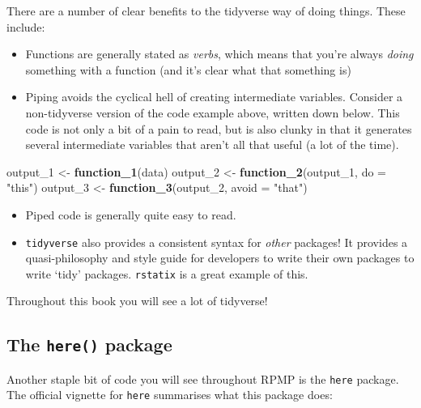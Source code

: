 \documentclass[
]{book}
\newenvironment{Shaded}{\begin{snugshade}}{\end{snugshade}}
\newcommand{\AttributeTok}[1]{\textcolor[rgb]{0.13,0.29,0.53}{#1}}
\newcommand{\FunctionTok}[1]{\textcolor[rgb]{0.13,0.29,0.53}{\textbf{#1}}}
\newcommand{\NormalTok}[1]{#1}
\newcommand{\OtherTok}[1]{\textcolor[rgb]{0.56,0.35,0.01}{#1}}
\newcommand{\StringTok}[1]{\textcolor[rgb]{0.31,0.60,0.02}{#1}}
\providecommand{\tightlist}{%
  \setlength{\itemsep}{0pt}\setlength{\parskip}{0pt}}
\begin{document}
There are a number of clear benefits to the tidyverse way of doing things. These include:

\begin{itemize}
\tightlist
\item
  Functions are generally stated as \emph{verbs}, which means that you're always \emph{doing} something with a function (and it's clear what that something is)
\item
  Piping avoids the cyclical hell of creating intermediate variables. Consider a non-tidyverse version of the code example above, written down below. This code is not only a bit of a pain to read, but is also clunky in that it generates several intermediate variables that aren't all that useful (a lot of the time).
\end{itemize}

\begin{Shaded}
\begin{Highlighting}[]
\NormalTok{output\_1 }\OtherTok{\textless{}{-}} \FunctionTok{function\_1}\NormalTok{(data)}
\NormalTok{output\_2 }\OtherTok{\textless{}{-}} \FunctionTok{function\_2}\NormalTok{(output\_1, }\AttributeTok{do =} \StringTok{"this"}\NormalTok{)}
\NormalTok{output\_3 }\OtherTok{\textless{}{-}} \FunctionTok{function\_3}\NormalTok{(output\_2, }\AttributeTok{avoid =} \StringTok{"that"}\NormalTok{)}
\end{Highlighting}
\end{Shaded}

\begin{itemize}
\tightlist
\item
  Piped code is generally quite easy to read.
\item
  \texttt{tidyverse} also provides a consistent syntax for \emph{other} packages! It provides a quasi-philosophy and style guide for developers to write their own packages to write `tidy' packages. \texttt{rstatix} is a great example of this.
\end{itemize}

Throughout this book you will see a lot of tidyverse!

\subsection{\texorpdfstring{The \texttt{here()} package}{The here() package}}\label{the-here-package}

Another staple bit of code you will see throughout RPMP is the \texttt{here} package. The official vignette for \texttt{here} summarises what this package does:
\end{document}
